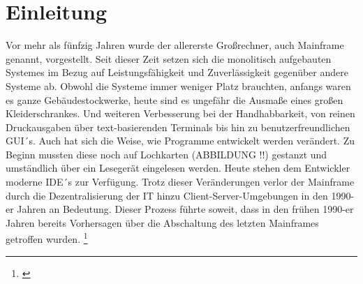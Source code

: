 \chapter{Einleitung}\label{ch:einleitung}
Vor mehr als fünfzig Jahren wurde der allererste Großrechner, auch Mainframe genannt, vorgestellt.
Seit dieser Zeit setzen sich die monolitisch aufgebauten Systemes im Bezug auf Leistungsfähigkeit und Zuverlässigkeit gegenüber andere Systeme ab.
Obwohl die Systeme immer weniger Platz brauchten, anfangs waren es ganze Gebäudestockwerke, heute sind es ungefähr die Ausmaße eines großen Kleiderschrankes.
Und weiteren Verbesserung bei der Handhabbarkeit, von reinen Druckausgaben über text-basierenden Terminals bis hin zu benutzerfreundlichen GUI´s.
Auch hat sich die Weise, wie Programme entwickelt werden verändert.
Zu Beginn mussten diese noch auf Lochkarten (ABBILDUNG !!) gestanzt und umständlich über ein Lesegerät eingelesen werden.
Heute stehen dem Entwickler moderne IDE´s zur Verfügung.
Trotz dieser Veränderungen verlor der Mainframe durch die Dezentralisierung der IT hinzu Client-Server-Umgebungen in den 1990-er Jahren an Bedeutung.
Dieser Prozess führte soweit, dass in den frühen 1990-er Jahren bereits Vorhersagen über die Abschaltung des letzten Mainframes getroffen wurden. \footnote{\cite{Alsop.1993}}
\cite{Ceruzzi.2003}

